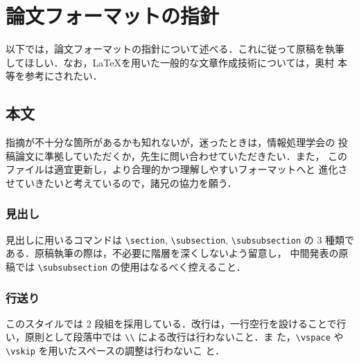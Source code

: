 \documentclass[a4j]{matsushita-zemi}
\begin{document}
\section{論文フォーマットの指針}
\label{sec:format}

以下では，論文フォーマットの指針について述べる．これに従って原稿を執筆
してほしい．なお，\LaTeX を用いた一般的な文章作成技術については，奥村
本\cite{okumura} 等を参考にされたい．


\subsection{本文}
指摘が不十分な箇所があるかも知れないが，迷ったときは，情報処理学会の
投稿論文に準拠していただくか，先生に問い合わせていただきたい．また，
このファイルは適宜更新し，より合理的かつ理解しやすいフォーマットへと
進化させていきたいと考えているので，諸兄の協力を願う．


\subsubsection{見出し}

見出しに用いるコマンドは \verb|\section|, \verb|\subsection|, \verb|\subsubsection|
の 3 種類である．原稿執筆の際は，不必要に階層を深くしないよう留意し，
中間発表の原稿では \verb|\subsubsection| の使用はなるべく控えること．

\subsubsection{行送り}

このスタイルでは 2 段組を採用している．改行は，一行空行を設けることで行
い，原則として段落中では \verb|\\| による改行は行わないこと．ま
た，\verb|\vspace| や\verb|\vskip| を用いたスペースの調整は行わないこ
と．
\end{document}
